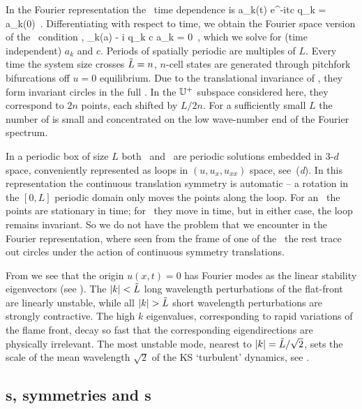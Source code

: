 In the Fourier representation the \reqva\ time dependence is
\beq
 a_k(t) e^{-itc q_k} = a_k(0)
\,.
Differentiating with respect to time, we obtain
the Fourier space version of the \reqv\ condition
,
\beq
 \pVeloc_k(a) - i q_k c a_k = 0
\,,
which we solve for (time independent) $a_k$ and $c$.
Periods of spatially periodic {\eqva} are multiples of $L$.
Every time the system size crosses  $\tilde{L}=n$,
$n$-cell states
are generated through pitchfork bifurcations off $u =0$
equilibrium.
Due to the translational invariance of {\KSe},
they form invariant circles
in the full \statesp.
In the $\mathbb{U}^+$ subspace considered here,
they correspond to $2n$ points, each shifted by $L/2n$.
For a sufficiently small $L$
the number of {\eqva} is small and
concentrated on the low wave-number end of the Fourier spectrum.

In a periodic box of size $L$
both \eqva\ and \reqva\ are  periodic solutions
embedded in 3-$d$ space, conveniently represented as loops in
$(u,u_x,u_{xx})$ space, see \,(\textit{d}).
In this representation the continuous translation symmetry
is automatic -- a rotation in the $[0,L]$ periodic domain only
moves the points along the loop. For an \eqv\ the points
are stationary in time; for \reqv\ they move in time, but in
either case, the loop remains invariant.
So we do not have the problem that we encounter in the Fourier
representation, where seen from the frame of one of the \eqva\
the rest trace out circles under the action of continuous symmetry
translations.

From  we see that the origin $u(x,t) = 0$
has Fourier modes as the linear stability eigenvectors
(see ).  The $|k|<\tilde{L}$
long wavelength perturbations of the flat-front {\eqv}
are linearly unstable, while all
$|k|> \tildeL$ short wavelength perturbations are strongly contractive.
The high $k$ eigenvalues, corresponding to rapid variations of
the flame front, decay so fast that the corresponding eigendirections
are physically irrelevant.
The most unstable mode, nearest to $|k|=\tilde{L}/\sqrt{2}$,
sets the scale of the mean wavelength $\sqrt{2}$
of the KS `turbulent' dynamics,
see .


\subsection{\Rpo s, symmetries and \po s} \label{sec:KSePO}

